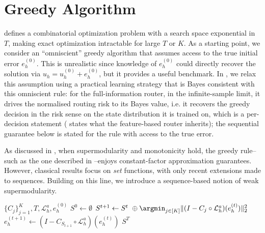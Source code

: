 \documentclass{article}
\newcommand{\edit}[1]{{\color{red}#1}}
\begin{document}


\section{Greedy Algorithm} \label{sec:greedy}

 defines a combinatorial optimization problem with a search space exponential in $T$, making exact optimization intractable for large $T$ or $K$. As a starting point, we consider an ``omniscient'' greedy algorithm that assumes access to the true initial error $e^{(0)}_h$. This is unrealistic since knowledge of $e^{(0)}_h$ could directly recover the solution via $u_h = u^{(0)}_h + e^{(0)}_h$, but it provides a useful benchmark.
In , we relax this assumption using a practical learning strategy that is Bayes consistent with this omniscient rule\edit{: for the full-information router, in the infinite-sample limit, it drives the normalised routing risk to its Bayes value, i.e. it recovers the greedy decision in the risk sense on the state distribution it is trained on, which is a per-decision statement (\Cref{sec:approxgreedy} states what the feature-based router inherits); the sequential guarantee below is stated for the rule with access to the true error}.

As discussed in , when supermodularity and monotonicity hold, the greedy rule--such as the one described in --enjoys constant-factor approximation guarantees. However, classical results focus on \textit{set} functions, with only recent extensions made to sequences. Building on this line, we introduce a sequence-based notion of weak supermodularity.

\begin{algorithm} 
\caption{Greedy Algorithm for a Hybrid PDE solver}\label{alg:greedy}
\begin{algorithmic}
\Require $\{C_{j}\}_{j = 1}^{K}, T, \mathcal{L}_h^a, e^{(0)}_h$
\State $S^{0} \gets \emptyset$
    \State $S^{t + 1} \gets S^{t} \ \oplus \argmin_{j \in [K]}\|( I - C_{j} \circ \mathcal{L}_{h}^a)(e^{(t)}_h)\|^2_2$
    \State $e^{(t + 1)}_h \gets (I - C_{S_{t+ 1}} \circ \mathcal{L}_{h}^a) (e^{(t)}_h)$
\EndFor
\State \Return $S^{T}$
\end{algorithmic}
\end{algorithm}
\end{document}

